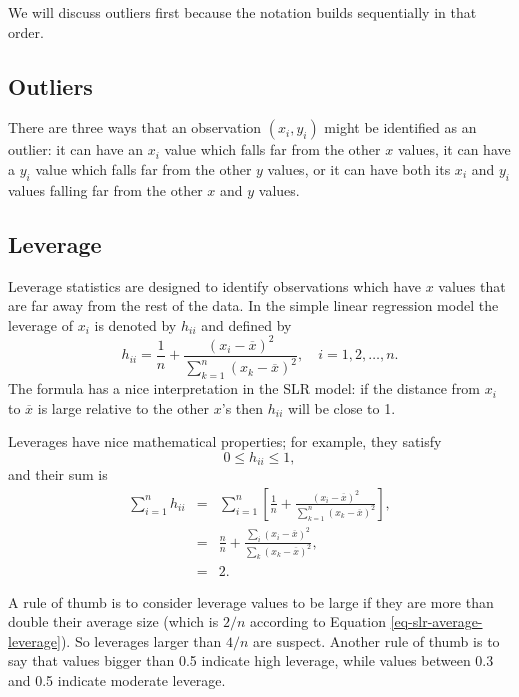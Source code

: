 We will discuss outliers first because the notation builds
sequentially in that order.
\subsection{Outliers}
\label{sec-11-5-1}
There are three ways that an observation \((x_{i},y_{i})\) might be
identified as an outlier: it can have an \(x_{i}\) value which falls
far from the other \(x\) values, it can have a \(y_{i}\) value which
falls far from the other \(y\) values, or it can have both its
\(x_{i}\) and \(y_{i}\) values falling far from the other \(x\) and
\(y\) values.
\subsection{Leverage}
\label{sec-11-5-2}
Leverage statistics are designed to identify observations which have
\(x\) values that are far away from the rest of the data. In the
simple linear regression model the leverage of \(x_{i}\) is denoted by
\(h_{ii}\) and defined by
\begin{equation}
h_{ii}=\frac{1}{n}+\frac{(x_{i}-\overline{x})^{2}}{\sum_{k=1}^{n}(x_{k}-\overline{x})^{2}},\quad i=1,2,\ldots,n.
\end{equation}
The formula has a nice interpretation in the SLR model: if the
distance from \(x_{i}\) to \(\overline{x}\) is large relative to the
other \(x\)'s then \(h_{ii}\) will be close to 1.

Leverages have nice mathematical properties; for example, they satisfy
\begin{equation}
\label{eq-slr-leverage-between}
0\leq h_{ii}\leq1,
\end{equation}
and their sum is
\begin{eqnarray}
\label{eq-slr-average-leverage}
\sum_{i=1}^{n}h_{ii} & = & \sum_{i=1}^{n}\left[\frac{1}{n}+\frac{(x_{i}-\overline{x})^{2}}{\sum_{k=1}^{n}(x_{k}-\overline{x})^{2}}\right],\\
 & = & \frac{n}{n}+\frac{\sum_{i}(x_{i}-\overline{x})^{2}}{\sum_{k}(x_{k}-\overline{x})^{2}},\\
 & = & 2.
\end{eqnarray}

A rule of thumb is to consider leverage values to be large if they are
more than double their average size (which is \(2/n\) according to
Equation \eqref{eq-slr-average-leverage}). So leverages larger than \(4/n\)
are suspect. Another rule of thumb is to say that values bigger than
0.5 indicate high leverage, while values between 0.3 and 0.5 indicate
moderate leverage.

